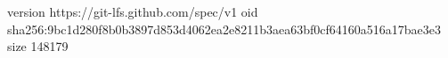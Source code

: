 version https://git-lfs.github.com/spec/v1
oid sha256:9bc1d280f8b0b3897d853d4062ea2e8211b3aea63bf0cf64160a516a17bae3e3
size 148179
